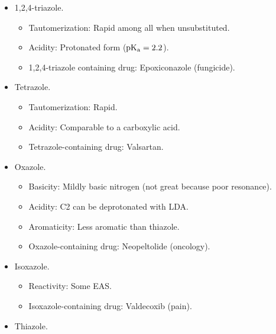 \documentclass[../notes.tex]{subfiles}
\begin{document}
\begin{itemize}
\begin{itemize}
\begin{itemize}
            \item Stability: Up to \SI{500}{\celsius}.
            \item Tautomerization: Rapid among all when unsubstituted.
            \item Amphoteric, like imidazole.
            \item Acidity: Protonated form ($\pKa=1.2$).
            \item 1,2,3-triazole containing chemical: Benzotriazole (chemical photography).
        \end{itemize}
        \item 1,2,4-triazole.
        \begin{itemize}
            \item Tautomerization: Rapid among all when unsubstituted.
            \item Acidity: Protonated form ($\operatorname{\text{p}K_\text{a}}=2.2$).
            \item 1,2,4-triazole containing drug: Epoxiconazole (fungicide).
        \end{itemize}
        \item Tetrazole.
        \begin{itemize}
            \item Tautomerization: Rapid.
            \item Acidity: Comparable to a carboxylic acid.
            \item Tetrazole-containing drug: Valsartan.
        \end{itemize}
        \item Oxazole.
        \begin{itemize}
            \item Basicity: Mildly basic nitrogen (not great because poor resonance).
            \item Acidity: C2 can be deprotonated with LDA.
            \item Aromaticity: Less aromatic than thiazole.
            \item Oxazole-containing drug: Neopeltolide (oncology).
        \end{itemize}
        \item Isoxazole.
        \begin{itemize}
            \item Reactivity: Some EAS.
            \item Isoxazole-containing drug: Valdecoxib (pain).
        \end{itemize}
        \item Thiazole.

\end{itemize}
\end{itemize}
\end{document}

